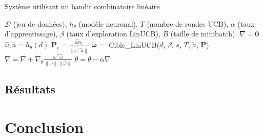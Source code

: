 \begin{algorithm}
    \caption{Système utilisant un bandit combinatoire linéaire}
    \begin{algorithmic}[1]
        \Require  $\mathcal{D}$ (jeu de données), $h_\theta$ (modèle neuronal), $T$ (nombre de rondes UCB), $\alpha$ (taux d'apprentissage), $\beta$ (taux d'exploration LinUCB), $B$ (taille de minibatch).
         
        \State $\nabla = \mathbf{0}$
        \State $\hat{\omega}, \tilde{a} = h_\theta(d)$
        \State $\mathbf{P}_i = \frac{\hat{\omega} \tilde{a}_i}{\lVert \hat{\omega^\intercal} \tilde{a} \rVert}$
        \EndFor
        \State $\mathbf{\omega} = $ Cible\_LinUCB($d$, $\beta$, $s$, $T$, $\tilde{a}$, $\mathbf{P}$)
        \State $\nabla = \nabla + \nabla_\theta \frac{\omega^\intercal \hat{\omega}}{\lVert \omega \rVert \lVert \hat{\omega} \rVert}$
        \EndFor
        \State $\theta = \theta - \alpha \nabla$
        \EndWhile
    \end{algorithmic}
    \label{alg:systeme_linucb}
\end{algorithm}

\subsection{Résultats}

\todo{}

\section{Conclusion}

\todo{}
